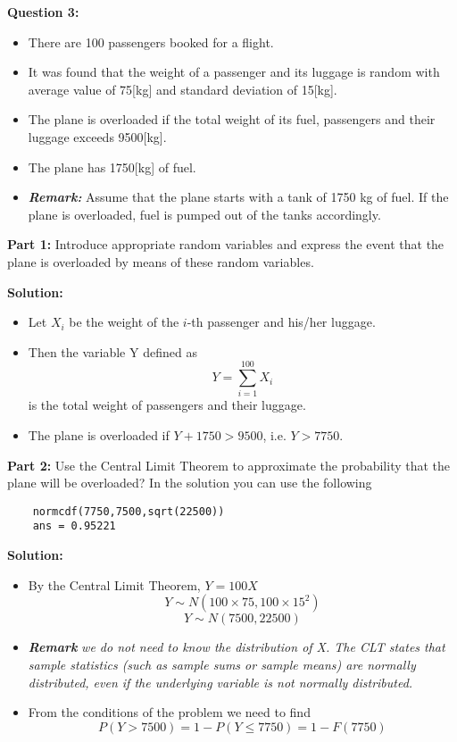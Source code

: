 \normalsize{
	\noindent\textbf{Question 3:}\\
	\begin{itemize} \item There are 100 passengers booked for a
		flight. \item It was found that the weight of a
		passenger and its luggage is random with average value of 75[kg] and standard deviation of 15[kg].
		\item The plane is overloaded if the total weight of its fuel, passengers and their luggage exceeds 9500[kg].
		\item The plane has 1750[kg] of fuel.
		\item \textbf{\emph{Remark:}} Assume that the plane starts with a tank of 1750 kg of fuel. If the plane is overloaded, fuel is pumped out of the tanks accordingly.
	\end{itemize}\bigskip
	
	\noindent\textbf{Part 1:} Introduce appropriate random variables and express the event that the plane is overloaded by means of these random variables.
	
	\noindent\textbf{Solution:}
	\begin{itemize}
		\item Let $X_i$ be the weight of the $i$-th passenger and his/her luggage.
		\item Then the variable Y defined as \[ Y = \sum^{100}_{i=1} X_i \] is the
		total weight of passengers and their luggage.
		\item The plane is overloaded if $Y + 1750 > 9500$, i.e. $Y > 7750$.
		
	\end{itemize}
	
	
	\noindent\textbf{Part 2:} Use the Central Limit Theorem to approximate the probability that the plane will be overloaded?
	In the solution you can use the following
	\begin{verbatim}
	normcdf(7750,7500,sqrt(22500))
	ans = 0.95221
	\end{verbatim}
	
	\noindent\textbf{Solution:}
	\begin{itemize}
		\item By the Central Limit Theorem, $Y = 100X $
		\[ Y\sim N(100 \times 75, 100 \times 15^2)  \]
		\[ Y\sim  N(7500, 22500) \]
		\item \textbf{\emph{Remark}}\emph{ we do not need to know the distribution of X. The CLT states that sample statistics (such as sample sums or sample means) are normally distributed, even if the underlying variable is not normally distributed.}
		\item From the conditions of the problem we need to find
		\[P(Y > 7500) = 1 - P(Y \leq 7750) = 1 - F(7750)\]
		

\end{itemize}}
